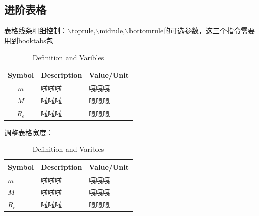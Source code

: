 \documentclass[UTF8]{ctexart}
\begin{document}
	\subsection{进阶表格}
	表格线条粗细控制：$\backslash$toprule,$\backslash$midrule,$\backslash$bottomrule的可选参数，这三个指令需要用到booktabs包
		\begin{table}[H]
		\centering
		\caption{Definition and Varibles}
		\begin{tabular}{cll} 
			\toprule[0.2em]
			Symbol & Description & Value/Unit \\
			\midrule[0.12em]
			$m$ & 啦啦啦 & 嘎嘎嘎 \\
			$M$ & 啦啦啦 & 嘎嘎嘎 \\
			$R_e$ & 啦啦啦 & 嘎嘎嘎 \\
			\bottomrule[0.2em]
		\end{tabular}
	\end{table}
调整表格宽度：
	\begin{table}[H]
		\centering
		\caption{Definition and Varibles}
		\begin{tabular}{p{2cm}p{7cm}p{2cm}} %
			\toprule[0.2em]
			Symbol & Description & Value/Unit \\
			\midrule[0.12em]
			$m$ & 啦啦啦 & 嘎嘎嘎 \\
			$M$ & 啦啦啦 & 嘎嘎嘎 \\
			$R_e$ & 啦啦啦 & 嘎嘎嘎 \\
			\bottomrule[0.2em]
		\end{tabular}
	\end{table}
   
\end{document}
